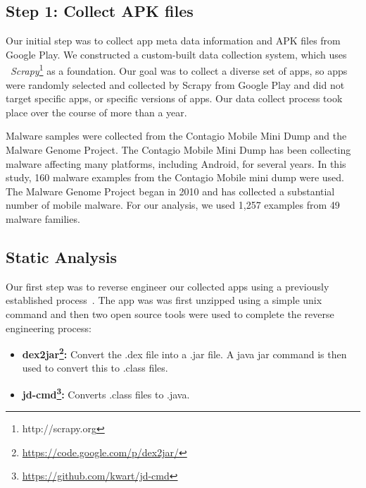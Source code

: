 \documentclass{sig-alternate-05-2015}
\begin{document}
\label{sec: collection}
\subsection{Step 1: Collect APK files}

Our initial step was to collect app meta data information and APK files from Google Play. We constructed a custom-built data collection system, which uses ~\emph{Scrapy}\footnote{http://scrapy.org} as a foundation. Our goal was to collect a diverse set of apps, so apps were randomly selected and collected by Scrapy from Google Play and did not target specific apps, or specific versions of apps. Our data collect process took place over the course of more than a year.

Malware samples were collected from the Contagio Mobile Mini Dump and the Malware Genome Project. The Contagio Mobile Mini Dump has been collecting malware affecting many platforms, including Android, for several years. In this study, 160 malware examples from the Contagio Mobile mini dump were used. The Malware Genome Project began in 2010 and has collected a substantial number of mobile malware. For our analysis, we used 1,257 examples from 49 malware families.


\subsection{Static Analysis}



Our first step was to reverse engineer our collected apps using a previously established process~\cite{Lee_2013}. The app was
was first unzipped using a simple unix command and then two open source tools were used to complete the reverse engineering process:
\begin{itemize}
    \setlength{\itemsep}{0pt} %
    \setlength{\parskip}{0pt} %
    \setlength{\parsep}{0pt}  %

  \item \textbf{dex2jar\footnote{\url{https://code.google.com/p/dex2jar/}}:} Convert the .dex file into a .jar file. A java jar command is then used to convert this to .class files.
  \item \textbf{jd-cmd\footnote{\url{https://github.com/kwart/jd-cmd}}:} Converts .class files to .java.
\end{itemize}
\end{document}
